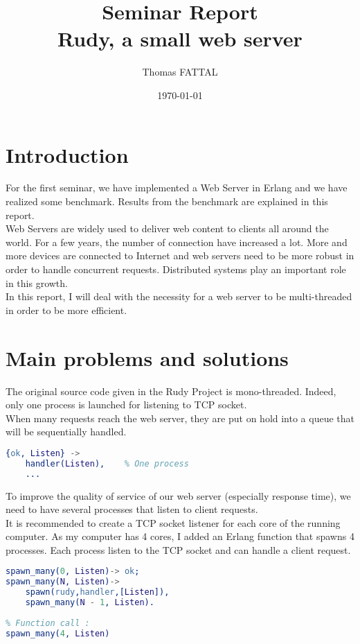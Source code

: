 \documentclass[a4paper, 11pt]{article}
\title{Seminar Report\\Rudy, a small web server}
\author{Thomas FATTAL}
\date{\today{}}
\begin{document}
\maketitle

\section{Introduction}

For the first seminar, we have implemented a Web Server in Erlang and we have realized some benchmark. Results from the benchmark are explained in this report.\\

Web Servers are widely used to deliver web content to clients all around the world. For a few years, the number of connection have increased a lot. More and more devices are connected to Internet and web servers need to be more robust in order to handle concurrent requests. Distributed systems play an important role in this growth. \\

In this report, I will deal with the necessity for a web server to be multi-threaded in order to be more efficient.

\section{Main problems and solutions}

The original source code given in the Rudy Project is mono-threaded. Indeed, only one process is launched for listening to TCP socket.\\
When many requests reach the web server, they are put on hold into a queue that will be sequentially handled. 
\begin{lstlisting}[language=erlang]
{ok, Listen} ->
	handler(Listen),	% One process
	...
\end{lstlisting}

To improve the quality of service of our web server (especially response time), we need to have several processes that listen to client requests. \\

It is recommended to create a TCP socket listener for each core of the running computer.
As my computer has 4 cores, I added an Erlang function that spawns 4 processes. Each process listen to the TCP socket and can handle a client request.

\begin{lstlisting}[language=erlang]
spawn_many(0, Listen)-> ok;
spawn_many(N, Listen)->
    spawn(rudy,handler,[Listen]),
    spawn_many(N - 1, Listen).
    
% Function call :
spawn_many(4, Listen)
\end{lstlisting}
\end{document}
